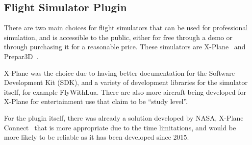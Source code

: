 \documentclass[../dissertation.tex]{subfiles}
\begin{document}
\subsection{Flight Simulator Plugin}

There are two main choices for flight simulators that can be used for professional
simulation, and is accessible to the public, either for free through a demo or through
purchasing it for a reasonable price. These simulators are X-Plane~\cite{x-plane} and
Prepar3D~\cite{p3d}.

X-Plane was the choice due to having better documentation for the Software Development Kit (SDK),
and a variety of development libraries for the simulator itself, for example FlyWithLua. There
are also more aircraft being developed for X-Plane for entertainment use that claim to be \enquote{study level}.

For the plugin itself, there was already a solution developed by NASA, X-Plane Connect~\cite{xpc}
that is more appropriate due to the time limitations, and would be more likely to be reliable as
it has been developed since 2015.
\end{document}
